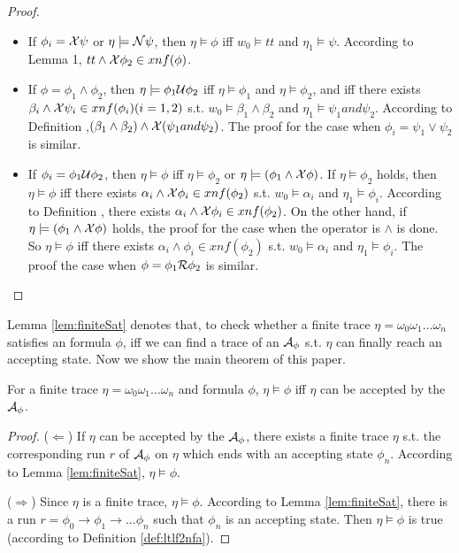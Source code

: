 \begin{proof}
\begin{enumerate}
\begin{itemize}
 		\item If $\phi_i=\mathcal{X} \psi$ or $\eta \models \mathcal{N} \psi$, then $\eta \models \phi$ iff $w_0 \models tt$ and $\eta_1 \models \psi$. According to Lemma 1, $tt \wedge \mathcal{X}\phi_2 \in xnf(\phi)$.\\
		\item If $\phi=\phi_1 \wedge \phi_2$, then $\eta \models \phi_1 \mathcal{U} \phi_2$ iff $\eta \models \phi_1$ and $\eta \models \phi_2$, and iff there exists $\beta_i \wedge \mathcal{X}\psi_i \in xnf(\phi_i)(i=1,2)$ s.t. $w_0 \models \beta_1 \wedge \beta_2$ and $\eta_1 \models \psi_1 and \psi_2$. According to Definition ,$(\beta_1 \wedge \beta_2)\wedge \mathcal{X}(\psi_1 and \psi_2)$. The proof for the case when $\phi_i=\psi_{1} \vee \psi_{2}$ is similar. \\
 		\item If $\phi_i=\phi_{1} \mathcal{U} \phi_{2}$, then $\eta \models \phi$ iff $\eta \models \phi_2$ or $\eta \models (\phi_1 \wedge \mathcal{X}\phi)$. If $\eta \models \phi_2$ holds, then $\eta \models \phi$ iff there exists $\alpha_i \wedge \mathcal{X}\phi_i \in xnf(\phi_2)$ s.t. $w_0 \models \alpha_i$ and $\eta_1 \models \phi_i$. According to Definition , there exists $\alpha_i \wedge \mathcal{X}\phi_i \in xnf(\phi_2)$. On the other hand, if $\eta \models (\phi_1 \wedge \mathcal{X}\phi)$ holds, the proof for the case when the operator is $\wedge$ is done. So $\eta \models \phi$ iff there exists $\alpha_i \wedge \phi_i \in xnf(\phi_2)$ s.t. $w_0 \models \alpha_i$ and $\eta_1 \models \phi_i$. The proof the case when $\phi=\phi_1 \mathcal{R} \phi_2$ is similar.
	\end{itemize}
\end{enumerate}

\end{proof}

Lemma \ref{lem:finiteSat} denotes that, to check whether a finite trace $\eta = \omega_0 \omega_1\ldots \omega_n$ satisfies an \ltlf formula $\phi$, iff we can find a trace of an \NFA $\mathcal{A}_\phi$ s.t. $\eta$ can finally reach an accepting state. Now we show the main theorem of this paper.

\begin{theorem}  
For a finite trace  $\eta = \omega_0\omega_1\ldots \omega_n $ and \ltlf formula $\phi$, $\eta \models \phi$ iff $\eta$ can be accepted by the \NFA $\mathcal{A}_\phi$.
\end{theorem}

\begin{proof} 
($\Leftarrow$) If $\eta$ can be accepted by the \NFA $\mathcal{A}_{\phi}$, there exists a finite trace $\eta$ s.t. the corresponding run $r$ of $\mathcal{A}_{\phi}$ on $\eta$ which ends with an accepting state $\phi_n$. According to Lemma \ref{lem:finiteSat}, $\eta \models \phi$. 

($\Rightarrow$) Since $\eta$ is a finite trace, $\eta \models \phi$. According to Lemma \ref{lem:finiteSat}, there is a run $r= \phi_0 \to \phi_1 \to ...\phi_n$ such that $\phi_n$ is an accepting state. Then $\eta \models \phi$ is true (according to Definition \ref{def:ltlf2nfa}).
\end{proof}


